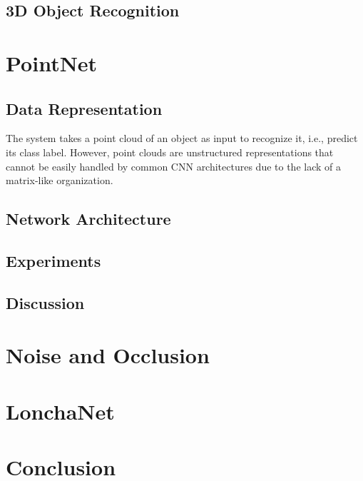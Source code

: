 \subsection{3D Object Recognition}
\label{cha:objrecog:sec:relatedworks:subsec:3d}

\section{PointNet}
\label{cha:objrecog:sec:pointnet}

\subsection{Data Representation}
\label{cha:objrecog:sec:pointnet:subsec:data}

The system takes a point cloud of an object as input to recognize it, i.e., predict its class label. However, point clouds are unstructured representations that cannot be easily handled by common \ac{CNN} architectures due to the lack of a matrix-like organization.

\subsection{Network Architecture}
\label{cha:objrecog:sec:pointnet:subsec:network}

\subsection{Experiments}
\label{cha:objrecog:sec:pointnet:subsec:experiments}

\subsection{Discussion}
\label{cha:objrecog:sec:pointnet:subsec:discussion}

\section{Noise and Occlusion}
\label{cha:objrecog:sec:study}

\section{LonchaNet}
\label{cha:objrecog:sec:lonchanet}

\section{Conclusion}
\label{cha:objrecog:sec:conclusion}
